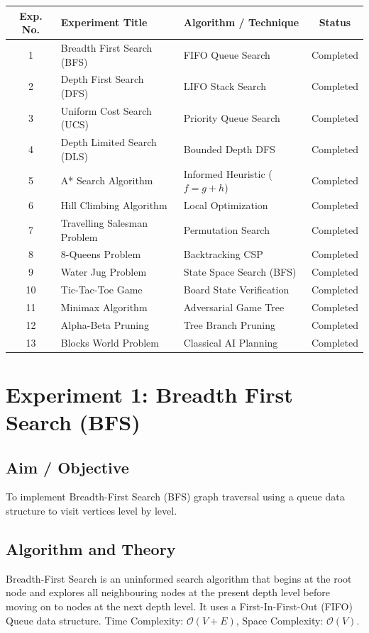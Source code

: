 \documentclass[11pt,a4paper]{report}
\begin{document}
\begin{table}[h!]
\centering
\small
\renewcommand{\arraystretch}{1.3}
\begin{tabular}{cp{6.5cm}p{4cm}c}
\toprule
\textbf{Exp. No.} & \textbf{Experiment Title} & \textbf{Algorithm / Technique} & \textbf{Status} \\
\midrule
1 & Breadth First Search (BFS) & FIFO Queue Search & Completed \\
2 & Depth First Search (DFS) & LIFO Stack Search & Completed \\
3 & Uniform Cost Search (UCS) & Priority Queue Search & Completed \\
4 & Depth Limited Search (DLS) & Bounded Depth DFS & Completed \\
5 & A* Search Algorithm & Informed Heuristic ($f=g+h$) & Completed \\
6 & Hill Climbing Algorithm & Local Optimization & Completed \\
7 & Travelling Salesman Problem & Permutation Search & Completed \\
8 & 8-Queens Problem & Backtracking CSP & Completed \\
9 & Water Jug Problem & State Space Search (BFS) & Completed \\
10 & Tic-Tac-Toe Game & Board State Verification & Completed \\
11 & Minimax Algorithm & Adversarial Game Tree & Completed \\
12 & Alpha-Beta Pruning & Tree Branch Pruning & Completed \\
13 & Blocks World Problem & Classical AI Planning & Completed \\
\bottomrule
\end{tabular}
\end{table}

\vspace{2em}
\tableofcontents

\newpage
\chapter{Experiment 1: Breadth First Search (BFS)}

\section{Aim / Objective}
To implement Breadth-First Search (BFS) graph traversal using a queue data structure to visit vertices level by level.

\section{Algorithm and Theory}
Breadth-First Search is an uninformed search algorithm that begins at the root node and explores all neighbouring nodes at the present depth level before moving on to nodes at the next depth level. It uses a First-In-First-Out (FIFO) Queue data structure. Time Complexity: $\mathcal{O}(V + E)$, Space Complexity: $\mathcal{O}(V)$.
\end{document}
